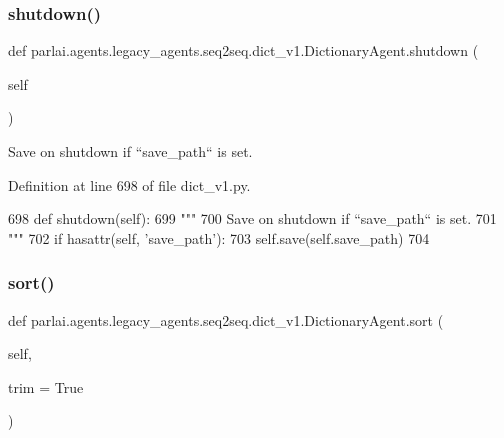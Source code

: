 \subsubsection{\texorpdfstring{shutdown()}{shutdown()}}
{\footnotesize\ttfamily def parlai.\+agents.\+legacy\+\_\+agents.\+seq2seq.\+dict\+\_\+v1.\+Dictionary\+Agent.\+shutdown (\begin{DoxyParamCaption}\item[{}]{self }\end{DoxyParamCaption})}

\begin{DoxyVerb}Save on shutdown if ``save_path`` is set.
\end{DoxyVerb}
 

Definition at line 698 of file dict\+\_\+v1.\+py.


\begin{DoxyCode}
698     \textcolor{keyword}{def }shutdown(self):
699         \textcolor{stringliteral}{"""}
700 \textcolor{stringliteral}{        Save on shutdown if ``save\_path`` is set.}
701 \textcolor{stringliteral}{        """}
702         \textcolor{keywordflow}{if} hasattr(self, \textcolor{stringliteral}{'save\_path'}):
703             self.save(self.save\_path)
704 
\end{DoxyCode}
\mbox{\label{classparlai_1_1agents_1_1legacy__agents_1_1seq2seq_1_1dict__v1_1_1DictionaryAgent_aa2697be1f1556da06f77d7eadf7cb9c6}} 
\subsubsection{\texorpdfstring{sort()}{sort()}}
{\footnotesize\ttfamily def parlai.\+agents.\+legacy\+\_\+agents.\+seq2seq.\+dict\+\_\+v1.\+Dictionary\+Agent.\+sort (\begin{DoxyParamCaption}\item[{}]{self,  }\item[{}]{trim = {\ttfamily True} }\end{DoxyParamCaption})}

